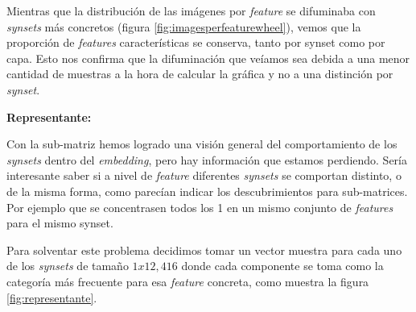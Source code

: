 \documentclass[12,twoside]{TFG-GM}
\theoremstyle{definition}
\theoremstyle{remark}
\begin{document}
Mientras que la distribución de las imágenes por \textit{feature} se difuminaba con \textit{synsets} más concretos (figura \ref{fig:imagesperfeaturewheel}), vemos que la proporción de \textit{features} características se conserva, tanto por synset como por capa. Esto nos confirma que la difuminación que veíamos sea debida a una menor cantidad de muestras a la hora de calcular la gráfica y no a una distinción por \textit{synset}. 

\textbf{Representante:}

Con la sub-matriz hemos logrado una visión general del comportamiento de los \textit{synsets} dentro del \textit{embedding}, pero hay información que estamos perdiendo. Sería interesante saber si a nivel de \textit{feature} diferentes \textit{synsets} se comportan distinto, o de la misma forma, como parecían indicar los descubrimientos para sub-matrices. Por ejemplo que se concentrasen todos los 1 en un mismo conjunto de \textit{features} para el mismo synset.

Para solventar este problema decidimos tomar un vector muestra para cada uno de los \textit{synsets} de tamaño $1x12,416$ donde cada componente se toma como la categoría más frecuente para esa \textit{feature} concreta, como muestra la figura \ref{fig:representante}. 
 
\end{document}

